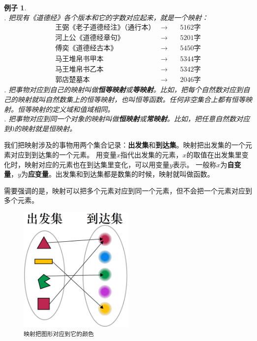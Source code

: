 \documentclass[12pt,UTF8]{ctexbook}
\newtheorem{ex}{例子}[section]
\begin{document}
\begin{ex}\label{ex:2-2-0}
    \mbox{} \\ 
    . 把现有《道德经》各个版本和它的字数对应起来，就是一个映射：
    $$
    \begin{array}{lll}
        \mbox{王弼《老子道德经注》（通行本）} &\longrightarrow &\quad 5162\mbox{字} \\
        \mbox{河上公《道德经章句》} &\longrightarrow &\quad 5201\mbox{字} \\ 
        \mbox{傅奕《道德经古本》} &\longrightarrow &\quad 5450\mbox{字} \\
        \mbox{马王堆帛书甲本} &\longrightarrow &\quad 5344\mbox{字} \\
        \mbox{马王堆帛书乙本} &\longrightarrow &\quad 5342\mbox{字} \\
        \mbox{郭店楚墓本} &\longrightarrow &\quad 2046\mbox{字}
    \end{array}
    $$
    . 把事物对应到自己的映射叫做\textbf{恒等映射}或\textbf{等映射}。比如，把每个自然数对应到自己的映射就叫自然数集上的恒等映射，也叫恒等函数。任何非空集合上都有恒等映射。恒等映射的定义域和值域相同。\\
    . 把事物对应到同一个对象的映射叫做\textbf{恒映射}或\textbf{常映射}。比如，把任意自然数对应到$0$的映射就是恒映射。
\end{ex}

我们把映射涉及的事物用两个集合记录：\textbf{出发集}和\textbf{到达集}。映射把出发集的一个元素对应到到达集的一个元素。
用变量$x$指代出发集的元素，$x$的取值在出发集里变化时，映射对应的元素也在到达集里变化，可以用变量$y$表示。
一般称$x$为\textbf{自变量}，$y$为\textbf{应变量}。出发集和到达集都是数集的时候，映射就叫做函数。

需要强调的是，映射可以把多个元素对应到同一个元素，但不会把一个元素对应到多个元素。

\begin{figure}[h]
    \vspace{4pt}
    \centering
    \includegraphics[width=0.5\textwidth]{tu/映射1.png}
    \caption*{\texttt{映射把图形对应到它的颜色}}
\end{figure}
\end{document}
